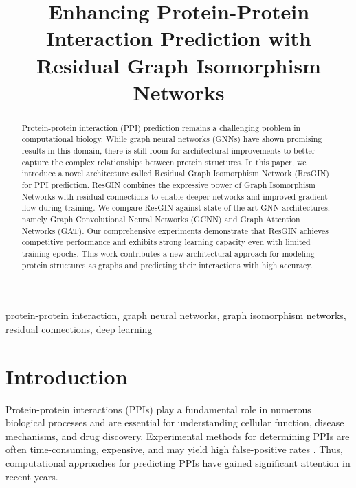 \documentclass[conference]{IEEEtran}
\begin{document}
\title{Enhancing Protein-Protein Interaction Prediction with Residual Graph Isomorphism Networks}

\author{
}

\maketitle

\begin{abstract}
Protein-protein interaction (PPI) prediction remains a challenging problem in computational biology. While graph neural networks (GNNs) have shown promising results in this domain, there is still room for architectural improvements to better capture the complex relationships between protein structures. In this paper, we introduce a novel architecture called Residual Graph Isomorphism Network (ResGIN) for PPI prediction. ResGIN combines the expressive power of Graph Isomorphism Networks with residual connections to enable deeper networks and improved gradient flow during training. We compare ResGIN against state-of-the-art GNN architectures, namely Graph Convolutional Neural Networks (GCNN) and Graph Attention Networks (GAT). Our comprehensive experiments demonstrate that ResGIN achieves competitive performance and exhibits strong learning capacity even with limited training epochs. This work contributes a new architectural approach for modeling protein structures as graphs and predicting their interactions with high accuracy.
\end{abstract}

\begin{IEEEkeywords}
protein-protein interaction, graph neural networks, graph isomorphism networks, residual connections, deep learning
\end{IEEEkeywords}

\section{Introduction}
Protein-protein interactions (PPIs) play a fundamental role in numerous biological processes and are essential for understanding cellular function, disease mechanisms, and drug discovery. Experimental methods for determining PPIs are often time-consuming, expensive, and may yield high false-positive rates \cite{skrabanek2008computational}. Thus, computational approaches for predicting PPIs have gained significant attention in recent years.
\end{document}

